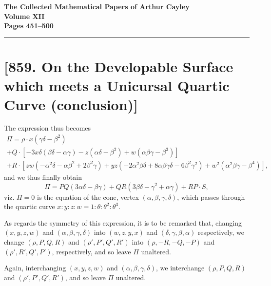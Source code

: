 \documentclass[11pt,a4paper]{book}
\begin{document}
\begin{center}
\Large\textbf{The Collected Mathematical Papers of Arthur Cayley}\\[6pt]
\large\textbf{Volume XII}\\[12pt]
\normalsize\textbf{Pages 451--500}
\end{center}

\hrule
\vspace{12pt}

\section*{[859. On the Developable Surface which meets a Unicursal Quartic Curve (conclusion)]}

The expression thus becomes
\begin{multline*}
\Pi = \rho \cdot x(\gamma\delta - \beta^2) \\
+ Q \cdot [-3x\delta(\beta\delta - \alpha\gamma) - z(\alpha\delta - \beta^2) + w(\alpha\beta\gamma - \beta^3)] \\
+ R \cdot [zw(-\alpha^2\delta - \alpha\beta^2 + 2\beta^2\gamma)
+ yz(-2\alpha^2\beta\delta + 8\alpha\beta\gamma\delta - 6\beta^2\gamma^2)
+ w^2(\alpha^2\beta\gamma - \beta^4)],
\end{multline*}
and we thus finally obtain
\[
\Pi = PQ(3\alpha\delta - \beta\gamma) + QR(3\beta\delta - \gamma^2 + \alpha\gamma) + RP \cdot S,
\]
viz. $\Pi = 0$ is the equation of the cone, vertex $(\alpha, \beta, \gamma, \delta)$, which passes through the quartic curve $x : y : z : w = 1 : \theta : \theta^2 : \theta^3$.

As regards the symmetry of this expression, it is to be remarked that, changing $(x, y, z, w)$ and $(\alpha, \beta, \gamma, \delta)$ into $(w, z, y, x)$ and $(\delta, \gamma, \beta, \alpha)$ respectively, we change $(\rho, P, Q, R)$ and $(\rho', P', Q', R')$ into $(\rho, -R, -Q, -P)$ and $(\rho', R', Q', P')$, respectively, and so leave $\Pi$ unaltered.

Again, interchanging $(x, y, z, w)$ and $(\alpha, \beta, \gamma, \delta)$, we interchange $(\rho, P, Q, R)$ and $(\rho', P', Q', R')$, and so leave $\Pi$ unaltered.
\end{document}
